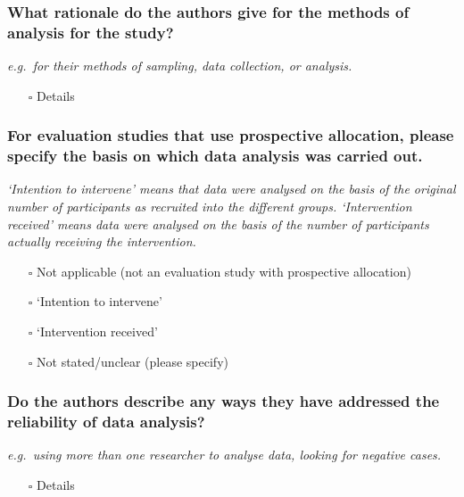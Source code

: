 \documentclass[
  doc, a4paper]{apa7}
\providecommand{\tightlist}{%
  \setlength{\itemsep}{0pt}\setlength{\parskip}{0pt}}
\begin{document}
\subsubsection{What rationale do the authors give for the methods of analysis for the study?}\label{what-rationale-do-the-authors-give-for-the-methods-of-analysis-for-the-study}

\emph{e.g.~for their methods of sampling, data collection, or analysis.}

\begin{itemize}
\tightlist
\item[$\square$]
  Details
\end{itemize}

\subsubsection{For evaluation studies that use prospective allocation, please specify the basis on which data analysis was carried out.}\label{for-evaluation-studies-that-use-prospective-allocation-please-specify-the-basis-on-which-data-analysis-was-carried-out.}

\emph{`Intention to intervene' means that data were analysed on the basis of the original number of participants as recruited into the different groups. `Intervention received' means data were analysed on the basis of the number of participants actually receiving the intervention.}

\begin{itemize}
\tightlist
\item[$\square$]
  Not applicable (not an evaluation study with prospective allocation)
\item[$\square$]
  `Intention to intervene'
\item[$\square$]
  `Intervention received'
\item[$\square$]
  Not stated/unclear (please specify)
\end{itemize}

\subsubsection{Do the authors describe any ways they have addressed the reliability of data analysis?}\label{do-the-authors-describe-any-ways-they-have-addressed-the-reliability-of-data-analysis}

\emph{e.g.~using more than one researcher to analyse data, looking for negative cases.}

\begin{itemize}
\tightlist
\item[$\square$]
  Details
\end{itemize}
\end{document}
